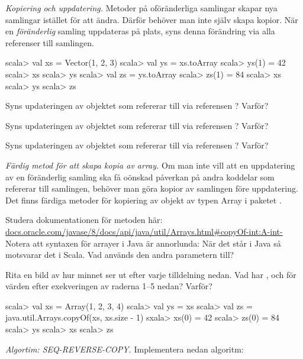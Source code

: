 \Task \emph{Kopiering och uppdatering.} Metoder på oföränderliga samlingar skapar nya samlingar istället för att ändra. Därför behöver man inte själv skapa kopior. När en \emph{föränderlig} samling uppdateras på plats, syns denna förändring via alla referenser till samlingen.

\begin{REPL}
scala> val xs = Vector(1, 2, 3)
scala> val ys = xs.toArray
scala> ys(1) = 42
scala> xs
scala> ys
scala> val zs = ys.toArray
scala> zs(1) = 84
scala> xs
scala> ys
scala> zs
\end{REPL}

\Subtask Syns updateringen av objektet som  refererar till via referensen ? Varför?

\Subtask Syns updateringen av objektet som  refererar till via referensen ? Varför? 

\Subtask Syns updateringen av objektet som  refererar till via referensen ? Varför?

\Task \emph{Färdig metod för att skapa kopia av array.} Om man inte vill att en uppdatering av en föränderlig samling ska få oönskad påverkan på andra koddelar som refererar till samlingen, behöver man göra kopior av samlingen före uppdatering. Det finns färdiga metoder för kopiering av objekt av typen Array i paketet . 

\Subtask\Pen Studera dokumentationen för metoden  här:\\ \href{https://docs.oracle.com/javase/8/docs/api/java/util/Arrays.html\#copyOf-int:A-int-}{docs.oracle.com/javase/8/docs/api/java/util/Arrays.html\#copyOf-int:A-int-} \\
Notera att syntaxen för arrayer i Java är annorlunda: När det står  i Java så motsvarar det  i Scala. Vad används den andra parametern till?

\Subtask\Pen Rita en bild av hur minnet ser ut efter varje tilldelning nedan. Vad har ,  och  för värden efter exekveringen av raderna 1--5 nedan? Varför? 
\begin{REPL}
scala> val xs = Array(1, 2, 3, 4)
scala> val ys = xs
scala> val zs = java.util.Arrays.copyOf(xs, xs.size - 1)
sxala> xs(0) = 42
scala> zs(0) = 84
scala> ys
scala> xs
scala> zs
\end{REPL}

\Task \emph{Algortim: SEQ-REVERSE-COPY.} Implementera nedan algoritm:

